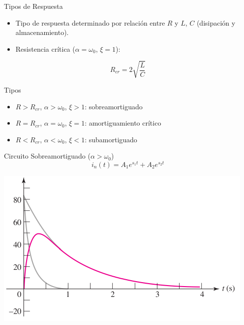 \documentclass[aspectratio=169, usenames,svgnames,dvipsnames]{beamer}
\begin{document}
\begin{frame}[label={sec:org9b53b6f}]{Tipos de Respuesta}
\begin{itemize}
\item Tipo de respuesta determinado por relación entre \(R\) y \(L\), \(C\) (disipación y almacenamiento).
\item Resistencia crítica (\(\alpha = \omega_0\), \(\xi = 1\)):
\end{itemize}

\[
  R_{cr} = 2\sqrt{\frac{L}{C}}
\]
\begin{block}{Tipos}
\begin{itemize}
\item \(R > R_{cr}\), \(\alpha > \omega_0\), \(\xi > 1\): \alert{sobreamortiguado}
\item \(R = R_{cr}\),  \(\alpha = \omega_0\), \(\xi = 1\): \alert{amortiguamiento crítico}
\item \(R < R_{cr}\),  \(\alpha < \omega_0\), \(\xi < 1\): \alert{subamortiguado}
\end{itemize}
\end{block}
\end{frame}
\begin{frame}[label={sec:orgb505c86}]{Circuito Sobreamortiguado (\(\alpha > \omega_0\))}
\[
  \boxed{i_n(t) = A_1 e^{s_1 t} + A_2 e^{s_2 t}}
\]
\begin{center}
\includegraphics[height=0.65\textheight]{../figs/Sobreamortiguado_HKD.pdf}
\end{center}
\end{frame}
\end{document}
